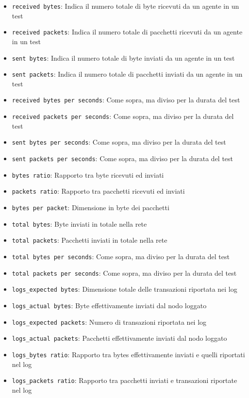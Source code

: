 \documentclass[12pt, a4paper]{article}
\begin{document}
\begin{itemize}
    \item \lstinline{received bytes}: Indica il numero totale di byte ricevuti da un agente in un test
    \item \lstinline{received packets}: Indica il numero totale di pacchetti ricevuti da un agente in un test
    \item \lstinline{sent bytes}: Indica il numero totale di byte inviati da un agente in un test
    \item \lstinline{sent packets}: Indica il numero totale di pacchetti inviati da un agente in un test
    \item \lstinline{received bytes per seconds}: Come sopra, ma diviso per la durata del test
    \item \lstinline{received packets per seconds}: Come sopra, ma diviso per la durata del test
    \item \lstinline{sent bytes per seconds}: Come sopra, ma diviso per la durata del test
    \item \lstinline{sent packets per seconds}: Come sopra, ma diviso per la durata del test
    \item \lstinline{bytes ratio}: Rapporto tra byte ricevuti ed inviati
    \item \lstinline{packets ratio}: Rapporto tra pacchetti ricevuti ed inviati
    \item \lstinline{bytes per packet}: Dimensione in byte dei pacchetti
    \item \lstinline{total bytes}: Byte inviati in totale nella rete
    \item \lstinline{total packets}: Pacchetti inviati in totale nella rete
    \item \lstinline{total bytes per seconds}: Come sopra, ma diviso per la durata del test
    \item \lstinline{total packets per seconds}: Come sopra, ma diviso per la durata del test
    \item \lstinline{logs_expected bytes}: Dimensione totale delle transazioni riportata nei log
    \item \lstinline{logs_actual bytes}: Byte effettivamente inviati dal nodo loggato
    \item \lstinline{logs_expected packets}: Numero di transazioni riportata nei log
    \item \lstinline{logs_actual packets}: Pacchetti effettivamente inviati dal nodo loggato
    \item \lstinline{logs_bytes ratio}: Rapporto tra bytes effettivamente inviati e quelli riportati nel log
    \item \lstinline{logs_packets ratio}: Rapporto tra pacchetti inviati e transazioni riportate nel log
\end{itemize}
\end{document}
